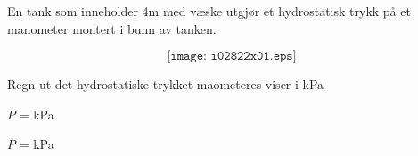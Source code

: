 

En tank som inneholder 4m med væske utgjør et hydrostatisk trykk på et manometer montert i bunn av tanken. 

$$\texttt{[image: i02822x01.eps]}$$

Regn ut det hydrostatiske trykket maometeres viser i kPa

\vskip 10pt

$P$ = \underbar{\hskip 50pt} kPa

\vskip 10pt







$P$ =  kPa
 










